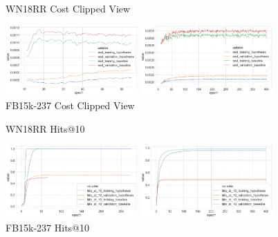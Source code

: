 \begin{figure}[H]
	\parbox{.5\linewidth}{
   		\caption{WN18RR Cost Clipped View}
   		\centering
    		\includegraphics[width=0.45\textwidth, height=0.2\textheight]{WN18RR_Cost_Results_Clipped}
		}
	\hfill
	\parbox{.5\linewidth}{
		\caption{FB15k-237 Cost Clipped View}
   		\centering
		\includegraphics[width=0.45\textwidth, height=0.2\textheight]{FB15k-237_Cost_Results_Clipped}
		}
\end{figure}


\begin{figure}[H]
	\parbox{.5\linewidth}{
   		\caption{WN18RR Hits@10}
   		\centering
    		\includegraphics[width=0.45\textwidth, height=0.2\textheight]{WN18RR_hits_at_10_Results}
		}
	\hfill
	\parbox{.5\linewidth}{
		\caption{FB15k-237 Hits@10}
   		\centering
		\includegraphics[width=0.45\textwidth, height=0.2\textheight]{FB15k-237_hits_at_10_Results}
		}
\end{figure}

